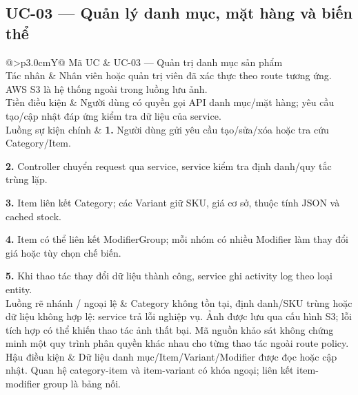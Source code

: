 \documentclass[12pt,a4paper,oneside]{report}
\makeatletter
\newcommand{\UC}[6]{%
\par\medskip\noindent\begin{tabularx}{\textwidth}{@{}>{\bfseries\color{navy}}p{3.0cm}Y@{}}\toprule
Mã UC & #1\\
Tác nhân & #2\\
Tiền điều kiện & #3\\
Luồng sự kiện chính & #4\\
Luồng rẽ nhánh / ngoại lệ & #5\\
Hậu điều kiện & #6\\
\bottomrule\end{tabularx}\par\smallskip
}
\makeatother
\begin{document}
\subsection{UC-03 — Quản lý danh mục, mặt hàng và biến thể}
\UC{UC-03 — Quản trị danh mục sản phẩm}{Nhân viên hoặc quản trị viên đã xác thực theo route tương ứng. AWS S3 là hệ thống ngoài trong luồng lưu ảnh.}{Người dùng có quyền gọi API danh mục/mặt hàng; yêu cầu tạo/cập nhật đáp ứng kiểm tra dữ liệu của service.}{\textbf{1.} Người dùng gửi yêu cầu tạo/sửa/xóa hoặc tra cứu Category/Item.\par\textbf{2.} Controller chuyển request qua service, service kiểm tra định danh/quy tắc trùng lặp.\par\textbf{3.} Item liên kết Category; các Variant giữ SKU, giá cơ sở, thuộc tính JSON và cached stock.\par\textbf{4.} Item có thể liên kết ModifierGroup; mỗi nhóm có nhiều Modifier làm thay đổi giá hoặc tùy chọn chế biến.\par\textbf{5.} Khi thao tác thay đổi dữ liệu thành công, service ghi activity log theo loại entity.}{Category không tồn tại, định danh/SKU trùng hoặc dữ liệu không hợp lệ: service trả lỗi nghiệp vụ. Ảnh được lưu qua cấu hình S3; lỗi tích hợp có thể khiến thao tác ảnh thất bại. Mã nguồn khảo sát không chứng minh một quy trình phân quyền khác nhau cho từng thao tác ngoài route policy.}{Dữ liệu danh mục/Item/Variant/Modifier được đọc hoặc cập nhật. Quan hệ category-item và item-variant có khóa ngoại; liên kết item-modifier group là bảng nối.}
\end{document}

